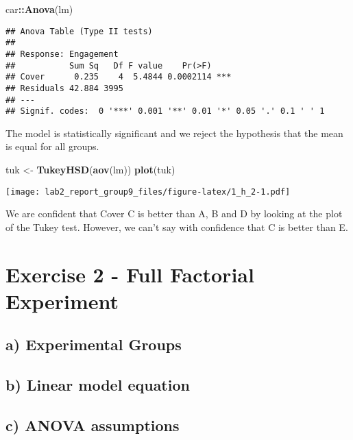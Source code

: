 \documentclass[
]{article}
\newenvironment{Shaded}{\begin{snugshade}}{\end{snugshade}}
\newcommand{\KeywordTok}[1]{\textcolor[rgb]{0.13,0.29,0.53}{\textbf{#1}}}
\newcommand{\NormalTok}[1]{#1}
\newcommand{\OperatorTok}[1]{\textcolor[rgb]{0.81,0.36,0.00}{\textbf{#1}}}
\newcommand{\StringTok}[1]{\textcolor[rgb]{0.31,0.60,0.02}{#1}}
\begin{document}
\begin{Shaded}
\begin{Highlighting}[]
\NormalTok{car}\OperatorTok{::}\KeywordTok{Anova}\NormalTok{(lm)}
\end{Highlighting}
\end{Shaded}

\begin{verbatim}
## Anova Table (Type II tests)
## 
## Response: Engagement
##           Sum Sq   Df F value    Pr(>F)    
## Cover      0.235    4  5.4844 0.0002114 ***
## Residuals 42.884 3995                      
## ---
## Signif. codes:  0 '***' 0.001 '**' 0.01 '*' 0.05 '.' 0.1 ' ' 1
\end{verbatim}

The model is statistically significant and we reject the hypothesis that
the mean is equal for all groups.

\begin{Shaded}
\begin{Highlighting}[]
\NormalTok{tuk <-}\StringTok{ }\KeywordTok{TukeyHSD}\NormalTok{(}\KeywordTok{aov}\NormalTok{(lm))}
\KeywordTok{plot}\NormalTok{(tuk)}
\end{Highlighting}
\end{Shaded}

\texttt{[image: lab2\_report\_group9\_files/figure-latex/1\_h\_2-1.pdf]}

We are confident that Cover C is better than A, B and D by looking at
the plot of the Tukey test. However, we can't say with confidence that C
is better than E.

\hypertarget{exercise-2---full-factorial-experiment}{%
\section{Exercise 2 - Full Factorial
Experiment}\label{exercise-2---full-factorial-experiment}}

\hypertarget{a-experimental-groups}{%
\subsection{a) Experimental Groups}\label{a-experimental-groups}}

\hypertarget{b-linear-model-equation}{%
\subsection{b) Linear model equation}\label{b-linear-model-equation}}

\hypertarget{c-anova-assumptions}{%
\subsection{c) ANOVA assumptions}\label{c-anova-assumptions}}
\end{document}
